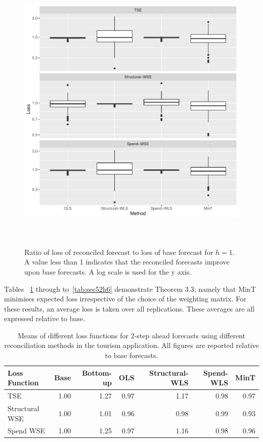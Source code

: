 \documentclass[12pt]{article}
\begin{document}
  	\begin{figure}[!hbt]
	\centering
	\small
	\includegraphics[width = \textwidth, height=14cm]{lossboxplots_6.pdf}
	\caption{ Ratio of loss of reconciled forecast to loss of base forecast for $h = 1$. A value less than 1 indicates that the reconciled forecasts improve upon base forecasts.  A log scale is used for the y axis.}
	\label{fig:BaseVSRecon_Fch6}
\end{figure}
  	
  	Tables ~\ref{tab:sec52h2} through to~\ref{tab:sec52h6} demonstrate Theorem 3.3; namely that MinT minimises expected loss irrespective of the choice of the weighting matrix.  For these results, an average loss is taken over all replications.  These averages are all expressed relative to base.
  	
  	
  	\begin{table}[ht]
  		\centering
  		\begin{tabular}{lrrrrrr}
  			\hline
  			Loss Function & Base & Bottom-up & OLS & Structural-WLS & Spend-WLS & MinT \\
  			\hline
  			TSE & 1.00 & 1.27 & 0.97 & 1.17 & 0.98 & 0.97 \\
  			Structural WSE & 1.00 & 1.01 & 0.96 & 0.98 & 0.99 & 0.93 \\
  			Spend WSE & 1.00 & 1.25 & 0.97 & 1.16 & 0.98 & 0.96 \\
  			\hline
  		\end{tabular}
  		\caption{Means of different loss functions for 2-step ahead forecasts using different reconciliation methods in the tourism application.  All figures are reported relative to base forecasts.}
  		\label{tab:sec52h2}
  	\end{table}
  	
\end{document}
